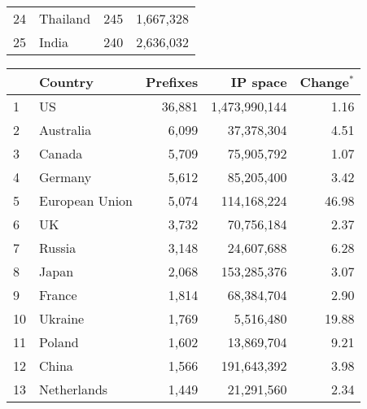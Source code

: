 \begin{table*}[p]
\begin{minipage}[t]{0.48\textwidth}
\begin{center}
\begin{tabular}{|l||l|r|r|}
24      &       Thailand        &       245     &       1,667,328       \tabularnewline
25      &       India   		&       240     &       2,636,032       \tabularnewline
	\hline
	\end{tabular}
	\end{center}
\end{minipage}
%
\quad
%
\begin{minipage}[t]{0.48\textwidth}
	\begin{center}
	\caption{Top 25 countries with the most number of allocated IP blocks on \textbf{April 23, 2009}}
	\label{tab:top25 rir prefixes 2009}
	\begin{tabular}{|l||l|r|r|r|}
		\hline
		&      \bf Country		& \bf Prefixes  &       \bf IP space 	& \bf Change$^{*}$ 	\tabularnewline \hline 
1       &       US      &       36,881  &       1,473,990,144   &         1.16  \tabularnewline
2       &       Australia       &       6,099   &       37,378,304      &         4.51  \tabularnewline
3       &       Canada  &       5,709   &       75,905,792      &         1.07  \tabularnewline
4       &       Germany &       5,612   &       85,205,400      &         3.42  \tabularnewline
5       &       European Union  &       5,074   &       114,168,224     &        46.98  \tabularnewline
6       &       UK      &       3,732   &       70,756,184      &         2.37  \tabularnewline
7       &       Russia  &       3,148   &       24,607,688      &         6.28  \tabularnewline
8       &       Japan   &       2,068   &       153,285,376     &         3.07  \tabularnewline
9       &       France  &       1,814   &       68,384,704      &         2.90  \tabularnewline
10      &       Ukraine &       1,769   &       5,516,480       &        19.88  \tabularnewline
11      &       Poland  &       1,602   &       13,869,704      &         9.21  \tabularnewline
12      &       China   &       1,566   &       191,643,392     &         3.98  \tabularnewline
13      &       Netherlands     &       1,449   &       21,291,560      &         2.34  \tabularnewline

\end{tabular}
\end{center}
\end{minipage}
\end{table*}
